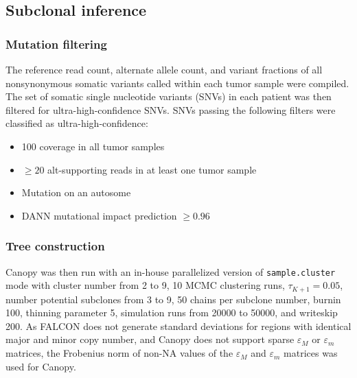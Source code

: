 \subsection{Subclonal inference}
\label{ssec:240:subclonal_inference}

\subsubsection{Mutation filtering}
\label{ssec:240:canopy_mut_filtering}
The reference read count, alternate allele count, and variant fractions of all nonsynonymous somatic variants called within each tumor sample were compiled. The set of somatic single nucleotide variants (SNVs) in each patient was then filtered for ultra-high-confidence SNVs. SNVs passing the following filters were classified as ultra-high-confidence:
\begin{itemize}
	\setlength\itemsep{-0.5em}
	\item{100\texttimes{} coverage in all tumor samples}
	\item{$\ge 20$ alt-supporting reads in at least one tumor sample}
	\item{Mutation on an autosome}
	\item{DANN \cite{quang2015} mutational impact prediction $\ge 0.96$}
\end{itemize}

\subsubsection{Tree construction}
\label{ssec:240:canopy_tree}
Canopy \cite{canopy} was then run with an in-house parallelized version of \texttt{sample.cluster} mode with cluster number from 2 to 9, 10 MCMC clustering runs, $\tau_{K+1} = 0.05$, number potential subclones from 3 to 9, 50 chains per subclone number, burnin 100, thinning parameter 5, simulation runs from 20000 to 50000, and writeskip 200. As FALCON does not generate standard deviations for regions with identical major and minor copy number, and Canopy does not support sparse $\varepsilon_M$ or $\varepsilon_m$ matrices, the Frobenius norm of non-NA values of the $\varepsilon_M$ and $\varepsilon_m$ matrices was used for Canopy. 

